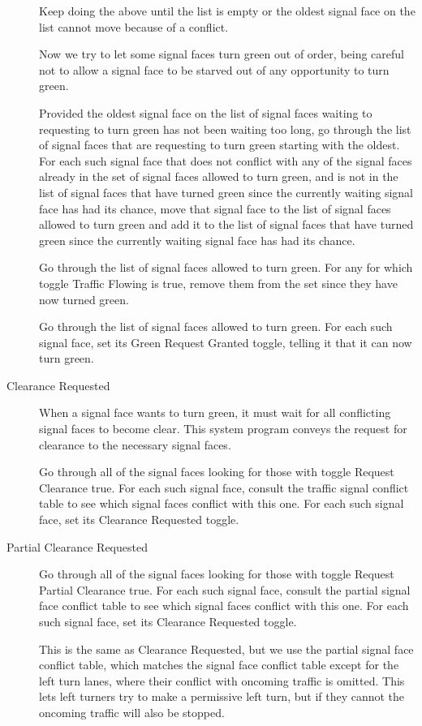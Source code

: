 \documentclass[letterpaper,twoside]{article}
\begin{document}
\begin{description}
Keep doing the above until the list is empty or the oldest signal
face on the list cannot move because of a conflict.

Now we try to let some signal faces turn green out of order, being
careful not to allow a signal face to be starved out of any
opportunity to turn green.

Provided the oldest signal face on the list of signal faces
waiting to requesting to turn green has not been waiting too long,
go through the list of signal faces that are requesting to turn green
starting with the oldest.  For each such signal face that does not
conflict with any of the signal faces already in the set of signal
faces allowed to turn green, and is not in the list of signal faces
that have turned green since the currently waiting signal face has
had its chance, move that signal face to the list of signal faces
allowed to turn green and add it to the list of signal faces that have
turned green since the currently waiting signal face has had its
chance.

Go through the list of signal faces allowed to turn green.  For any
for which toggle Traffic Flowing is true, remove them from the set
since they have now turned green.

Go through the list of signal faces allowed to turn green.  For each
such signal face, set its Green Request Granted toggle, telling it
that it can now turn green.

\item[Clearance Requested]

When a signal face wants to turn green, it must wait for all conflicting
signal faces to become clear.  This system program conveys the request
for clearance to the necessary signal faces.

Go through all of the signal faces looking for those with toggle
Request Clearance true.  For each such signal face, consult the traffic
signal conflict table to see which signal faces conflict with this one.
For each such signal face, set its Clearance Requested toggle.

\item[Partial Clearance Requested]

Go through all of the signal faces looking for those with toggle
Request Partial Clearance true.  For each such signal face, consult the
partial signal face conflict table to see which signal faces conflict
with this one.
For each such signal face, set its Clearance Requested toggle.

This is the same as Clearance Requested, but we use the partial signal face
conflict table, which matches the signal face conflict table except
for the left turn lanes, where their conflict with oncoming traffic is
omitted.
This lets left turners try to make a
permissive left turn, but if they cannot the oncoming traffic will also
be stopped.


\end{description}
\end{document}
